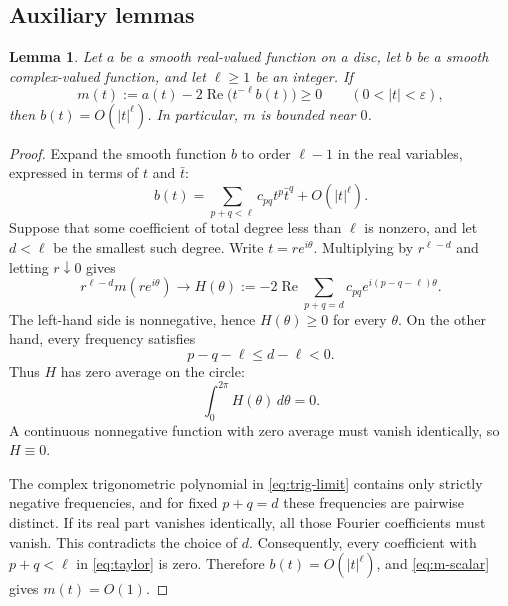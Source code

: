 \documentclass[11pt,letterpaper]{amsart}
\numberwithin{equation}{section}
\newtheorem{lemm}[prop]{Lemma}
\begin{document}
\subsection{Auxiliary lemmas}

\begin{lemm}\label{lem:pole}
Let $a$ be a smooth real-valued function on a disc, let $b$ be a smooth
complex-valued function, and let $\ell\geq1$ be an integer. If
\begin{equation}\label{eq:m-scalar}
 m(t):=a(t)-2\operatorname{Re}\bigl(t^{-\ell}b(t)\bigr)\geq0
 \qquad(0<|t|<\varepsilon),
\end{equation}
then $b(t)=O(|t|^\ell)$. In particular, $m$ is bounded near $0$.
\end{lemm}

\begin{proof}
Expand the smooth function $b$ to order $\ell-1$ in the real variables, expressed in terms of $t$ and $\bar t$:
\begin{equation}\label{eq:taylor}
 b(t)=\sum_{p+q<\ell}c_{pq}t^p\bar t^q+O(|t|^\ell).
\end{equation}
Suppose that some coefficient of total degree less than $\ell$ is nonzero,
and let $d<\ell$ be the smallest such degree. Write $t=re^{i\theta}$.
Multiplying by $r^{\ell-d}$ and letting $r\downarrow0$ gives
\begin{equation}\label{eq:trig-limit}
 r^{\ell-d}m(re^{i\theta})\longrightarrow
 H(\theta):=-2\operatorname{Re}\!\sum_{p+q=d}
 c_{pq}e^{i(p-q-\ell)\theta}.
\end{equation}
The left-hand side is nonnegative, hence $H(\theta)\geq0$ for every $\theta$.
On the other hand, every frequency satisfies
\[
 p-q-\ell\leq d-\ell<0.
\]
Thus $H$ has zero average on the circle:
\[
 \int_0^{2\pi}H(\theta)\,d\theta=0.
\]
A continuous nonnegative function with zero average must vanish identically,
so $H\equiv0$.

The complex trigonometric polynomial in \eqref{eq:trig-limit} contains only
strictly negative frequencies, and for fixed $p+q=d$ these frequencies are
pairwise distinct. If its real part vanishes identically, all those Fourier
coefficients must vanish. This contradicts the choice of $d$.
Consequently, every coefficient with $p+q<\ell$ in \eqref{eq:taylor} is zero.
Therefore $b(t)=O(|t|^\ell)$, and \eqref{eq:m-scalar} gives $m(t)=O(1)$.
\end{proof}
\end{document}
